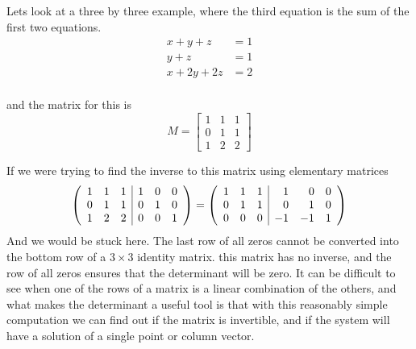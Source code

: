 {Lets look at a three by three example, where the third equation is the sum of the first two equations.
\begin{align*}
x+y + z &= 1\\
y +z &= 1\\
x + 2y+ 2z &= 2\\
\end{align*}

and the matrix for this is 
\[
M =\begin{bmatrix}
1 & 1 &1\\
0 & 1 & 1\\
1 & 2& 2 
\end{bmatrix}
\]

If we were trying to find the inverse to this matrix using elementary matrices
\[ \left( \begin{array}{ccc | ccc}
1 & 1 &1 & 	1 & 0 & 0\\
0 & 1 & 1 & 	0 & 1 & 0 \\
1 & 2 & 2 &	0 & 0 & 1
\end{array} \right) 
=
 \left( \begin{array}{ccc | rrr}
1 & 1 &1 & 	1 & 0 & 0\\
0 & 1 & 1 & 	0 & 1 & 0 \\
0 & 0 & 0 &	-1 & -1 & 1
\end{array} \right) 
\]
And we would be stuck here. The last row of all zeros cannot be converted into the bottom row of a $3 \times 3$ identity matrix. this matrix has no inverse, and the row of all zeros ensures that the determinant will be zero. It can be difficult to see when one of the rows of a matrix is a linear combination of the others, and what makes the determinant a useful tool is that with this reasonably simple computation we can find out if the matrix is invertible, and if the system will have a solution of a single point or column vector. 
} %

